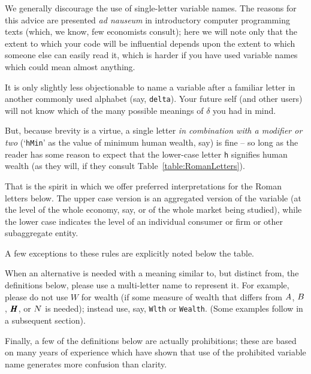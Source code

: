 \documentclass[12pt]{econtex}
\begin{document}
We generally discourage the use of single-letter variable names.  The reasons for this advice are presented \textit{ad nauseum} in introductory computer programming texts (which, we know, few economists consult); here we will note only that the extent to which your code will be influential depends upon the extent to which someone else can easily read it, which is harder if you have used variable names which could mean almost anything.

It is only slightly less objectionable to name a variable after a familiar letter in another commonly used alphabet (say, \texttt{delta}).  Your future self (and other users) will not know which of the many possible meanings of $\delta$ you had in mind.

But, because brevity is a virtue, a single letter \textit{in combination with a modifier or two} (`\texttt{hMin}' as the value of minimum human wealth, say) is fine -- so long as the reader has some reason to expect that the lower-case letter \texttt{h} signifies human wealth (as they will, if they consult Table~\ref{table:RomanLetters}).

That is the spirit in which we offer preferred interpretations for the Roman letters below.  The upper case version is an aggregated version of the variable (at the level of the whole economy, say, or of the whole market being studied), while the lower case indicates the level of an individual consumer or firm or other subaggregate entity.  

A few exceptions to these rules are explicitly noted below the table.

When an alternative is needed with a meaning similar to, but distinct from, the definitions below, please use a multi-letter name to represent it.  For example, please do not use $W$ for wealth (if some measure of wealth that differs from $A$, $B$, $\pmb{H}$, or $N$ is needed); instead use, say, \texttt{Wlth} or \texttt{Wealth}.  (Some examples follow in a subsequent section).

Finally, a few of the definitions below are actually prohibitions; these are based on many years of experience which have shown that use of the prohibited variable name generates more confusion than clarity.  
\end{document}
